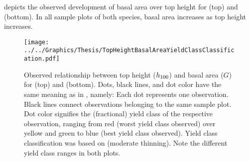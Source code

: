  depicts the observed development of basal area over top height for \Beech{} (top) and \Spruce{} (bottom).  In all sample plots of both species, basal area increases as top height increases.

\begin{figure}[t]
  \texttt{[image: ../../Graphics/Thesis/TopHeightBasalAreaYieldClassClassification.pdf]}
  \caption{Observed relationship between top height (\(h_{100}\)) and basal area (\(G\)) for \Beech{} (top) and \Spruce{} (bottom).  Dots, black lines, and dot color have the same meaning as in , namely:  Each dot represents one observation.  Black lines connect observations belonging to the same sample plot.  Dot color signifies the (fractional) yield class of the respective observation, ranging from red (worst yield class observed) over yellow and green to blue (best yield class observed). Yield class classification was based on \textcite{Schober1995} (moderate thinning).  Note the different yield class ranges in both plots.}
  \label{fig:TopHeightBasalAreaYieldClassClassification}
\end{figure}


